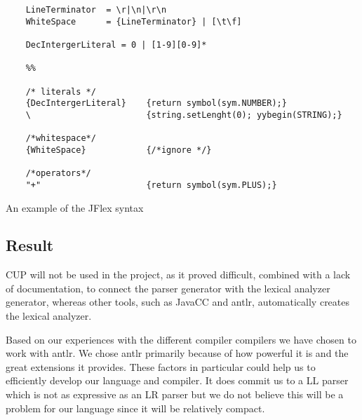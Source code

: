 \begin{listing}[htb!]
  \centering
  \begin{verbatim}
    LineTerminator  = \r|\n|\r\n
    WhiteSpace      = {LineTerminator} | [\t\f]

    DecIntergerLiteral = 0 | [1-9][0-9]*

    %%

    /* literals */
    {DecIntergerLiteral}    {return symbol(sym.NUMBER);}
    \                       {string.setLenght(0); yybegin(STRING);}

    /*whitespace*/ 
    {WhiteSpace}            {/*ignore */}  
    
    /*operators*/
    "+"                     {return symbol(sym.PLUS);}
  \end{verbatim}
  \caption{An example of the JFlex syntax}
  \label{list:jflex}
\end{listing}


\subsection{Result}
CUP will not be used in the project, as it proved difficult, combined with a lack of documentation, to connect the parser generator with the lexical analyzer generator, whereas other tools, such as JavaCC and \gls{antlr}, automatically creates the lexical analyzer.


Based on our experiences with the different compiler compilers we have chosen to work with \gls{antlr}. We chose \gls{antlr} primarily because of how powerful it is and the great extensions it provides. These factors in particular could help us to efficiently develop our language and compiler. It does commit us to a LL parser which is not as expressive as an LR parser but we do not believe this will be a problem for our language since it will be relatively compact.
